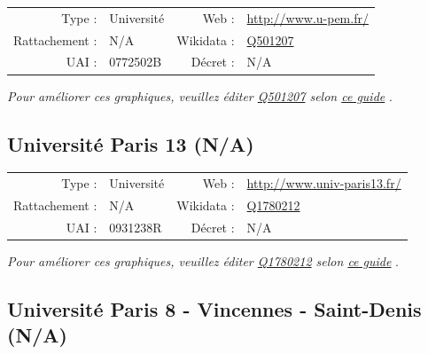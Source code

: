 \documentclass[12pt,french,landscape]{article}
\begin{document}
\begin{tabular*}{0.45\textwidth}{rp{2cm}rl}  
\hline  
Type : & Université & Web : &\href{http://www.u-pem.fr/}{http://www.u-pem.fr/} \\  
Rattachement : & N/A & Wikidata : & \href{https://www.wikidata.org/entity/Q501207}{Q501207} \\  
UAI : & 0772502B & Décret : & N/A \\  
\hline  
\end{tabular*}

\textit{\scriptsize Pour améliorer ces graphiques, veuillez éditer \href{https://www.wikidata.org/entity/Q501207}{Q501207}  selon \href{https://github.com/cpesr/wikidataESR/blob/master/Rmd/wikidataESR.md}{ce guide}}
.


\newpage

\hypertarget{universituxe9-paris-13-na}{%
\subsection{Université Paris 13 (N/A)}\label{universituxe9-paris-13-na}}

\begin{tabular*}{0.45\textwidth}{rp{2cm}rl}  
\hline  
Type : & Université & Web : &\href{http://www.univ-paris13.fr/}{http://www.univ-paris13.fr/} \\  
Rattachement : & N/A & Wikidata : & \href{https://www.wikidata.org/entity/Q1780212}{Q1780212} \\  
UAI : & 0931238R & Décret : & N/A \\  
\hline  
\end{tabular*}

\textit{\scriptsize Pour améliorer ces graphiques, veuillez éditer \href{https://www.wikidata.org/entity/Q1780212}{Q1780212}  selon \href{https://github.com/cpesr/wikidataESR/blob/master/Rmd/wikidataESR.md}{ce guide}}
.


\newpage

\hypertarget{universituxe9-paris-8---vincennes---saint-denis-na}{%
\subsection{Université Paris 8 - Vincennes - Saint-Denis
(N/A)}\label{universituxe9-paris-8---vincennes---saint-denis-na}}
\end{document}
